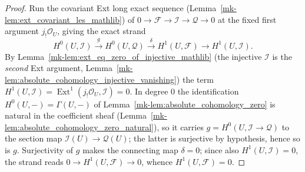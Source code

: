 \begin{proof}
  \leanok
    Run the covariant Ext long exact sequence
  (Lemma~\ref{mk-lem:ext_covariant_les_mathlib}) of
  \(0 \to \mathcal{F} \to \mathcal{I} \to \mathcal{Q} \to 0\) at the fixed first
  argument \(j_!\mathcal{O}_U\), giving the exact strand
  \[
    H^0(U, \mathcal{I}) \xrightarrow{\ g\ } H^0(U, \mathcal{Q})
      \xrightarrow{\ \delta\ } H^1(U, \mathcal{F}) \to H^1(U, \mathcal{I}).
  \]
  By Lemma~\ref{mk-lem:ext_eq_zero_of_injective_mathlib} (the injective \(\mathcal{I}\) is
  the \emph{second} Ext argument, Lemma~\ref{mk-lem:absolute_cohomology_injective_vanishing})
  the term \(H^1(U, \mathcal{I}) =
  \operatorname{Ext}^1(j_!\mathcal{O}_U, \mathcal{I}) = 0\). In degree \(0\) the
  identification \(H^0(U, -) = \Gamma(U, -)\) of Lemma~\ref{mk-lem:absolute_cohomology_zero}
  is natural in the coefficient sheaf
  (Lemma~\ref{mk-lem:absolute_cohomology_zero_natural}), so it carries \(g = H^0(U,
  \mathcal{I} \to \mathcal{Q})\) to the section map
  \(\mathcal{I}(U) \to \mathcal{Q}(U)\); the latter is surjective by hypothesis, hence so is
  \(g\). Surjectivity of \(g\) makes the connecting map
  \(\delta = 0\); since also \(H^1(U, \mathcal{I}) = 0\), the strand reads
  \(0 \to H^1(U, \mathcal{F}) \to 0\), whence \(H^1(U, \mathcal{F}) = 0\).
\end{proof}

